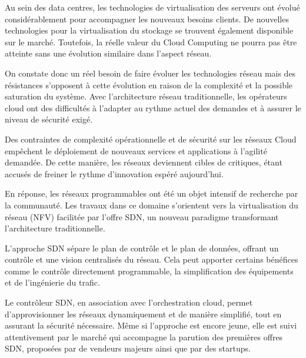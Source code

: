 

Au sein des data centres, les technologies de virtualisation des serveurs ont évolué considérablement pour accompagner les nouveaux besoins clients. De nouvelles technologies pour la virtualisation du stockage se trouvent également disponible sur le marché. Toutefois, la réelle valeur du Cloud Computing ne pourra pas être atteinte sans une évolution similaire dans l'aspect réseau.

On constate donc un réel besoin de faire évoluer les technologies réseau mais des résistances s'opposent à cette évolution en raison de la complexité et la possible saturation du système. Avec l'architecture réseau traditionnelle, les opérateurs cloud ont des difficultés à l'adapter au rythme actuel des demandes et à assurer le niveau de sécurité exigé.

Des contraintes de complexité opérationnelle et de sécurité sur les réseaux Cloud empêchent le déploiement de nouveaux services et applications à l'agilité demandée. De cette manière, les réseaux deviennent cibles de critiques, étant accusés de freiner le rythme d'innovation espéré aujourd'hui.

En réponse, les réseaux programmables ont été un objet intensif de recherche par la communauté. Les travaux dans ce domaine s'orientent vers la virtualisation du réseau (NFV) facilitée par l'offre SDN, un nouveau paradigme transformant l'architecture traditionnelle. 

L'approche SDN sépare le plan de contrôle et le plan de données, offrant un contrôle et une vision centralisés du réseau. Cela peut apporter certains bénéfices comme le contrôle directement programmable, la simplification des équipements et de l'ingénierie du trafic. %


Le contrôleur SDN, en association avec l'orchestration cloud, permet d'approvisionner les réseaux dynamiquement et de manière simplifié, tout en assurant la sécurité nécessaire. Même si l'approche est encore jeune, elle est suivi attentivement par le marché qui accompagne la parution des premières offres SDN, proposées par de vendeurs majeurs ainsi que par des startups.


